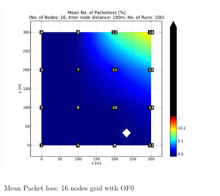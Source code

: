 \begin{figure}[htbp]
{      \hspace{-30pt}
      \includegraphics[scale=0.23]{Pics/results/16/OF0/grid/dist100_montecarlo_contour_packetloss.pdf}}
  \caption{Mean Packet loss: 16 nodes grid with OF0}
 \label{fig:pl_16_grid_of0}
\end{figure}

